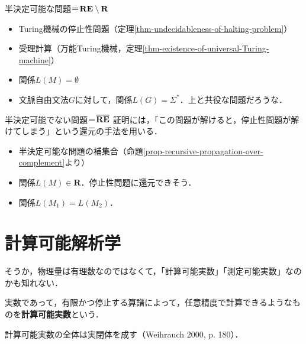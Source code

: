\documentclass[uplatex, dvipdfmx]{jsreport}
\begin{document}
\begin{itembox}[l]{半決定可能な問題＝$\mathbf{RE}\setminus\mathbf{R}$}
    \begin{itemize}
        \item Turing機械の停止性問題（定理\ref{thm-undecidableness-of-halting-problem}）
        \item 受理計算（万能Turing機械，定理\ref{thm-existence-of-universal-Turing-machine}）
        \item 関係$L(M)=\emptyset$
        \item 文脈自由文法$G$に対して，関係$L(G)=\Sigma^*$．上と共役な問題だろうな．
    \end{itemize}
\end{itembox}

\begin{itembox}[l]{半決定可能でない問題＝$\overline{\mathbf{RE}}$}
    証明には，「この問題が解けると，停止性問題が解けてしまう」という還元の手法を用いる．
    \begin{itemize}
        \item 半決定可能な問題の補集合（命題\ref{prop-recursive-propagation-over-complement}より）
        \item 関係$L(M)\in\mathbf{R}$．停止性問題に還元できそう．
        \item 関係$L(M_1)=L(M_2)$．
    \end{itemize}
\end{itembox}

\section{計算可能解析学}

\begin{tcolorbox}[colframe=ForestGreen, colback=ForestGreen!10!white, breakable]
    そうか，物理量は有理数なのではなくて，「計算可能実数」「測定可能実数」なのかも知れない．
\end{tcolorbox}

\begin{definition}
    実数であって，有限かつ停止する算譜によって，任意精度で計算できるようなものを\textbf{計算可能実数}という．
\end{definition}

\begin{proposition}
    計算可能実数の全体は実閉体を成す（Weihrauch 2000, p. 180）．
\end{proposition}
\end{document}

